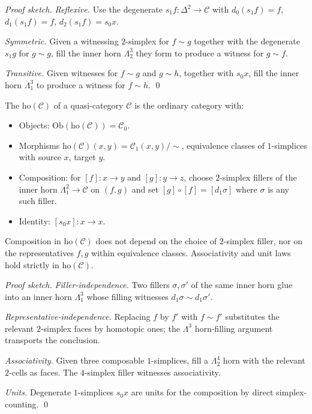 \begin{proof}[Proof sketch]
\emph{Reflexive.} Use the degenerate $s_1 f : \Delta^2 \to \mathcal{C}$
with $d_0(s_1 f) = f$, $d_1(s_1 f) = f$, $d_2(s_1 f) = s_0 x$.

\emph{Symmetric.} Given a witnessing $2$-simplex for $f \sim g$ together
with the degenerate $s_1 g$ for $g \sim g$, fill the inner horn
$\Lambda^3_2$ they form to produce a witness for $g \sim f$.

\emph{Transitive.} Given witnesses for $f \sim g$ and $g \sim h$,
together with $s_0 x$, fill the inner horn $\Lambda^3_1$ to produce a
witness for $f \sim h$. \qed
\end{proof}

\begin{definition}
\label{def:ho-cat}
The  $\mathrm{ho}(\mathcal{C})$ of a
quasi-category $\mathcal{C}$ is the ordinary category with:
\begin{itemize}
  \item Objects: $\mathrm{Ob}(\mathrm{ho}(\mathcal{C})) = \mathcal{C}_0$.
  \item Morphisms $\mathrm{ho}(\mathcal{C})(x, y) = \mathcal{C}_1(x, y) / \sim$,
        equivalence classes of $1$-simplices with source $x$, target $y$.
  \item Composition: for $[f] : x \to y$ and $[g] : y \to z$, choose
        $2$-simplex fillers of the inner horn $\Lambda^2_1 \to \mathcal{C}$
        on $(f, g)$ and set $[g] \circ [f] = [d_1 \sigma]$ where $\sigma$
        is any such filler.
  \item Identity: $[s_0 x] : x \to x$.
\end{itemize}
\end{definition}

\begin{theorem}
\label{thm:ho-welldef}
Composition in $\mathrm{ho}(\mathcal{C})$ does not depend on the choice
of $2$-simplex filler, nor on the representatives $f, g$ within
equivalence classes. Associativity and unit laws hold strictly in
$\mathrm{ho}(\mathcal{C})$.
\end{theorem}

\begin{proof}[Proof sketch]
\emph{Filler-independence.} Two fillers $\sigma, \sigma'$ of the same
inner horn glue into an inner horn $\Lambda^3_1$ whose filling witnesses
$d_1 \sigma \sim d_1 \sigma'$.

\emph{Representative-independence.} Replacing $f$ by $f'$ with $f \sim f'$
substitutes the relevant $2$-simplex faces by homotopic ones; the
$\Lambda^3$ horn-filling argument transports the conclusion.

\emph{Associativity.} Given three composable $1$-simplices, fill a
$\Lambda^4_2$ horn with the relevant $2$-cells as faces. The $4$-simplex
filler witnesses associativity.

\emph{Units.} Degenerate $1$-simplices $s_0 x$ are units for the
composition by direct simplex-counting.
\qed
\end{proof}

